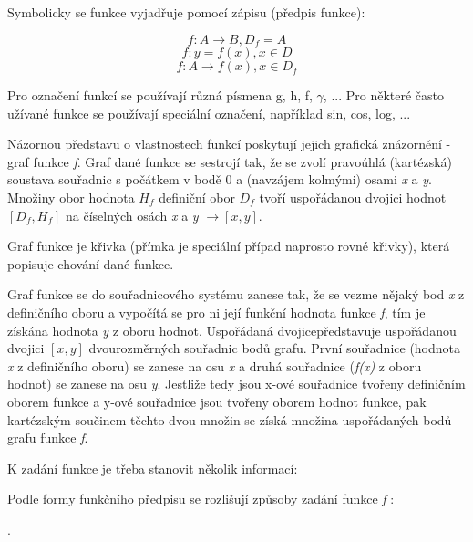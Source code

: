 Symbolicky se funkce vyjadřuje pomocí zápisu (předpis funkce):

$$ f:A \rightarrow B, D_f = A$$
$$ f: y = f(x), x \in D $$
$$ f: A \rightarrow f(x), x \in D_f $$

Pro označení funkcí se používají různá písmena g, h, f, $\gamma$, ... Pro některé často užívané funkce se používají speciální označení, například sin, cos, log, ...


Názornou představu o vlastnostech funkcí poskytují jejich grafická znázornění - graf funkce {\it f}. Graf dané funkce se sestrojí tak, že se zvolí pravoúhlá (kartézská) soustava souřadnic s počátkem v bodě 0 a (navzájem kolmými) osami {\it x} a {\it y}. Množiny obor hodnota $H_f$ definiční obor $D_f$ tvoří uspořádanou dvojici hodnot  $ [D_f,H_f] $ na číselných osách {\it x} a {\it y} $\rightarrow [x,y]$.

Graf funkce je křivka (přímka je speciální případ naprosto rovné křivky), která popisuje chování dané funkce.

\vskip 4mm
\centerline{}
\vskip 4mm


Graf funkce se do souřadnicového systému zanese tak, že se vezme nějaký bod {\it x} z definičního oboru a vypočítá se pro ni její funkční hodnota funkce {\it f}, tím je získána hodnota {\it y} z oboru hodnot. Uspořádaná dvojicepředstavuje uspořádanou dvojici $[x,y]$ dvourozměrných souřadnic bodů grafu. První souřadnice (hodnota {\it x} z definičního oboru) se zanese na osu {\it x} a druhá souřadnice ({\it f(x)} z oboru hodnot) se zanese na osu {\it y}.
Jestliže tedy jsou x-ové souřadnice tvořeny definičním oborem funkce a y-ové souřadnice jsou tvořeny oborem hodnot funkce, pak kartézským součinem těchto dvou množin se získá množina uspořádaných bodů grafu funkce {\it f}.


K zadání funkce je třeba stanovit několik informací:

\vskip 4mm
\vskip 4mm

Podle formy funkčního předpisu se rozlišují způsoby zadání funkce {\it f} :

\vskip 4mm
.
\vskip 4mm

